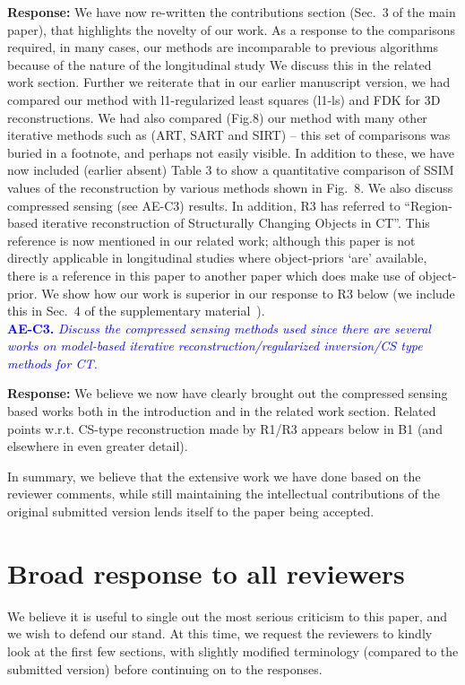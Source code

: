\documentclass{article}
\begin{document}
\textbf{Response:} We have now re-written the contributions section (Sec.~3 of the main paper), that highlights the novelty of our work.  
As a response to the comparisons required,  in many cases, our methods are incomparable to previous algorithms because of the nature of the longitudinal study  We discuss this in the related work section. Further we reiterate that in our earlier manuscript version, we had compared our method with l1-regularized least squares (l1-ls) and FDK for 3D reconstructions. We had also compared (Fig.8) our method with many other iterative methods such as (ART, SART and SIRT) -- this set of comparisons was buried in a footnote, and perhaps not easily visible.
In addition to these, we have now included (earlier absent) Table 3 to show a quantitative comparison of SSIM values of the reconstruction by various methods shown in Fig.~8.  We also discuss compressed sensing (see AE-C3) results.
In addition, 
R3 has referred to ``Region-based iterative reconstruction of Structurally Changing Objects in CT''. This reference is now mentioned in our related work; although this paper is not directly applicable in longitudinal studies where object-priors `are' available, there is a reference in this paper to another paper which does make use of object-prior. We show how our work is superior in our response to R3 below (we include this in Sec.~4 of the supplementary material~\cite{supp_paper}). \\

\textcolor{blue}{\textbf{AE-C3.}\textit{ Discuss the compressed sensing methods used since there are several works on model-based iterative reconstruction/regularized inversion/CS type methods for CT.}}

\textbf{Response:} We believe we now have clearly brought out the compressed sensing based works both in the introduction and in the related work section.  Related points w.r.t. CS-type reconstruction made by R1/R3 appears below in B1 (and elsewhere in even greater detail).

In summary, we believe that the extensive work we have done based on the reviewer comments, while still maintaining the intellectual contributions of the original submitted version lends itself to the paper being accepted.

\section{Broad response to all reviewers}

We believe it is useful to single out the most serious criticism to this paper, and we wish to defend our stand. At this time, we request the reviewers  to kindly look at the first few sections, with slightly modified terminology (compared to the submitted version)  before continuing on to the responses. 
\end{document}
